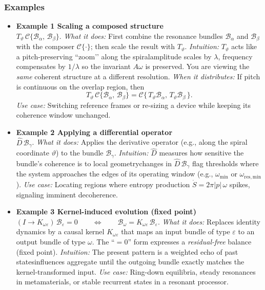 \subsubsection{Examples}
\begin{itemize}[leftmargin=*]
  \item \textbf{Example 1 \emdash Scaling a composed structure}\\[2pt]
    \( T_{\vartheta}\,\mathcal{C}\{\mathcal{B}_\alpha,\,\mathcal{B}_\beta\} \).
    \emph{What it does:} First combine the resonance bundles \(\mathcal{B}_\alpha\) and \(\mathcal{B}_\beta\) with the composer \(\mathcal{C}\{\cdot\}\); then scale the result with \(T_{\vartheta}\).
    \emph{Intuition:} \(T_{\vartheta}\) acts like a pitch-preserving ``zoom’’ along the spiral\emdashif amplitude scales by \(\lambda\), frequency compensates by \(1/\lambda\) so the invariant \(A\omega\) is preserved. You are viewing the \emph{same} coherent structure at a different resolution.
    \emph{When it distributes:} If pitch is continuous on the overlap region, then
    \[
      T_{\vartheta}\,\mathcal{C}\{\mathcal{B}_\alpha,\,\mathcal{B}_\beta\}
      = \mathcal{C}\{\,T_{\vartheta}\mathcal{B}_\alpha,\,T_{\vartheta}\mathcal{B}_\beta\,\}.
    \]
    \emph{Use case:} Switching reference frames or re-sizing a device while keeping its coherence window unchanged.

  \item \textbf{Example 2 \emdash Applying a differential operator}\\[2pt]
    \( \hat D\,\mathcal{B}_\gamma \).
    \emph{What it does:} Applies the derivative operator (e.g., along the spiral coordinate \(\vartheta\)) to the bundle \(\mathcal{B}_\gamma\).
    \emph{Intuition:} \(\hat D\) measures how sensitive the bundle’s coherence is to local geometry\emdashsharp changes in \(\hat D\,\mathcal{B}_\gamma\) flag thresholds where the system approaches the edges of its operating window (e.g., \(\omega_{\min}\) or \(\omega_{\mathrm{res,min}}\)).
    \emph{Use case:} Locating regions where entropy production \( \dot S = 2\pi|p|\,\omega \) spikes, signaling imminent decoherence.

  \item \textbf{Example 3 \emdash Kernel-induced evolution (fixed point)}\\[2pt]
    \( (I \to K_{\omega\varepsilon})\,\mathcal{B}_\varepsilon = 0 \qquad \Longleftrightarrow \qquad \mathcal{B}_\omega = K_{\omega\varepsilon}\,\mathcal{B}_\varepsilon. \)
    \emph{What it does:} Replaces identity dynamics by a causal kernel \(K_{\omega\varepsilon}\) that maps an input bundle of type \(\varepsilon\) to an output bundle of type \(\omega\). The “\(=0\)” form expresses a \emph{residual-free} balance (fixed point).
    \emph{Intuition:} The present pattern is a weighted echo of past states\emdashdelayed influences aggregate until the outgoing bundle exactly matches the kernel-transformed input.
    \emph{Use case:} Ring-down equilibria, steady resonances in metamaterials, or stable recurrent states in a resonant processor.
\end{itemize}




